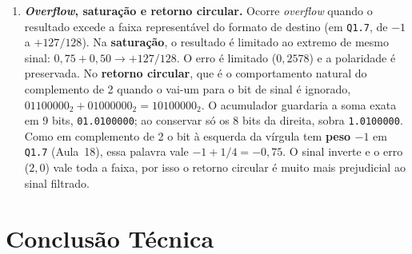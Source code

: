 \documentclass[11pt,a4paper]{article}
\newcommand{\MetricaEGanhoDCEsc}{0{,}678704}
\newcommand{\MetricaEGanhoDCEscdB}{-3{,}3664}
\newcommand{\MetricaESomaAbsEscQ}{1{,}0078125}
\newcommand{\MetricaESomaAbsEscQInt}{129}
\newcommand{\MetricaESomaEscQ}{0{,}6953125}
\newcommand{\MetricaESomaEscQInt}{89}
\newcommand{\MetricaEGanhoDCEscQdB}{-3{,}1564}
\newcommand{\MetricaEPicoEscQ}{0{,}9999390}
\begin{document}
\begin{enumerate}[leftmargin=1.6em, itemsep=3pt]
    A alternativa é \textbf{dividir os coeficientes por $\sum_k|h[k]|$} e admitir entrada de até $127/128$. O preço é a queda do ganho DC para $\MetricaEGanhoDCEsc$ ($\MetricaEGanhoDCEscdB$~dB) antes da quantização. Além disso, os novos coeficientes precisam ser arredondados para \texttt{Q1.7}, e a verificação final deve usar os valores armazenados. Para este filtro, $\sum_k|h_q[k]| = \MetricaESomaAbsEscQInt/128 = \MetricaESomaAbsEscQ$ e $\sum_k h_q[k] = \MetricaESomaEscQInt/128 = \MetricaESomaEscQ$ ($\MetricaEGanhoDCEscQdB$~dB). Como $\sum_k|h_q[k]| > 1$, o pior caso com entrada $127/128$ chega a $\MetricaEPicoEscQ$ e ainda excede $127/128$: o arredondamento desfez parte do escalonamento. É por isso que a aula recomenda conferir \texttt{sum(abs(hq))}, \texttt{sum(hq)} e \texttt{freqz(hq,1,...)} depois da quantização.

    \item \textbf{\textit{Overflow}, saturação e retorno circular.}
    Ocorre \textit{overflow} quando o resultado excede a faixa representável do formato de destino (em \texttt{Q1.7}, de $-1$ a $+127/128$). Na \textbf{saturação}, o resultado é limitado ao extremo de mesmo sinal: $0,75 + 0,50 \to +127/128$. O erro é limitado ($0,2578$) e a polaridade é preservada. No \textbf{retorno circular}, que é o comportamento natural do complemento de 2 quando o vai-um para o bit de sinal é ignorado, $01100000_2 + 01000000_2 = 10100000_2$. O acumulador guardaria a soma exata em 9 bits, \texttt{01.0100000}; ao conservar só os 8 bits da direita, sobra \texttt{1.0100000}. Como em complemento de 2 o bit à esquerda da vírgula tem \textbf{peso $-1$} em \texttt{Q1.7} (Aula~18), essa palavra vale $-1 + 1/4 = -0,75$. O sinal inverte e o erro ($2,0$) vale toda a faixa, por isso o retorno circular é muito mais prejudicial ao sinal filtrado.
\end{enumerate}

\section{Conclusão Técnica}
\end{document}
